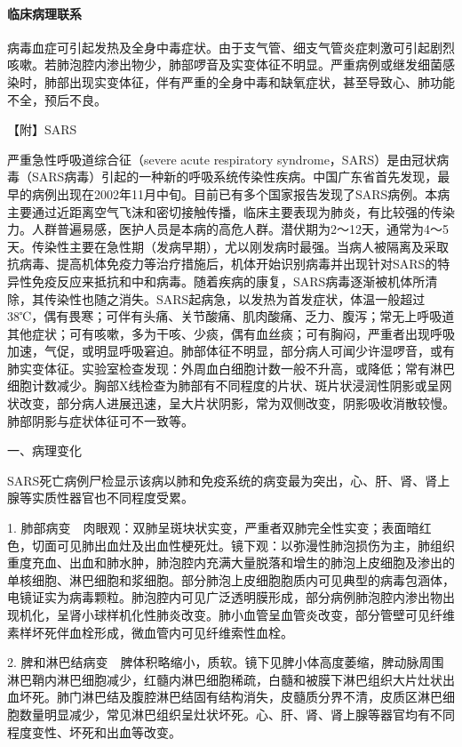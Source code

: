 \paragraph{临床病理联系}
病毒血症可引起发热及全身中毒症状。由于支气管、细支气管炎症刺激可引起剧烈咳嗽。若肺泡腔内渗出物少，肺部啰音及实变体征不明显。严重病例或继发细菌感染时，肺部出现实变体征，伴有严重的全身中毒和缺氧症状，甚至导致心、肺功能不全，预后不良。

{【附】SARS}

严重急性呼吸道综合征（severe acute respiratory
syndrome，SARS）是由冠状病毒（SARS病毒）引起的一种新的呼吸系统传染性疾病。中国广东省首先发现，最早的病例出现在2002年11月中旬。目前已有多个国家报告发现了SARS病例。本病主要通过近距离空气飞沫和密切接触传播，临床主要表现为肺炎，有比较强的传染力。人群普遍易感，医护人员是本病的高危人群。潜伏期为2～12天，通常为4～5天。传染性主要在急性期（发病早期），尤以刚发病时最强。当病人被隔离及采取抗病毒、提高机体免疫力等治疗措施后，机体开始识别病毒并出现针对SARS的特异性免疫反应来抵抗和中和病毒。随着疾病的康复，SARS病毒逐渐被机体所清除，其传染性也随之消失。SARS起病急，以发热为首发症状，体温一般超过38℃，偶有畏寒；可伴有头痛、关节酸痛、肌肉酸痛、乏力、腹泻；常无上呼吸道其他症状；可有咳嗽，多为干咳、少痰，偶有血丝痰；可有胸闷，严重者出现呼吸加速，气促，或明显呼吸窘迫。肺部体征不明显，部分病人可闻少许湿啰音，或有肺实变体征。实验室检查发现：外周血白细胞计数一般不升高，或降低；常有淋巴细胞计数减少。胸部X线检查为肺部有不同程度的片状、斑片状浸润性阴影或呈网状改变，部分病人进展迅速，呈大片状阴影，常为双侧改变，阴影吸收消散较慢。肺部阴影与症状体征可不一致等。

一、病理变化

SARS死亡病例尸检显示该病以肺和免疫系统的病变最为突出，心、肝、肾、肾上腺等实质性器官也不同程度受累。

1.
肺部病变　肉眼观：双肺呈斑块状实变，严重者双肺完全性实变；表面暗红色，切面可见肺出血灶及出血性梗死灶。镜下观：以弥漫性肺泡损伤为主，肺组织重度充血、出血和肺水肿，肺泡腔内充满大量脱落和增生的肺泡上皮细胞及渗出的单核细胞、淋巴细胞和浆细胞。部分肺泡上皮细胞胞质内可见典型的病毒包涵体，电镜证实为病毒颗粒。肺泡腔内可见广泛透明膜形成，部分病例肺泡腔内渗出物出现机化，呈肾小球样机化性肺炎改变。肺小血管呈血管炎改变，部分管壁可见纤维素样坏死伴血栓形成，微血管内可见纤维索性血栓。

2.
脾和淋巴结病变　脾体积略缩小，质软。镜下见脾小体高度萎缩，脾动脉周围淋巴鞘内淋巴细胞减少，红髓内淋巴细胞稀疏，白髓和被膜下淋巴组织大片灶状出血坏死。肺门淋巴结及腹腔淋巴结固有结构消失，皮髓质分界不清，皮质区淋巴细胞数量明显减少，常见淋巴组织呈灶状坏死。心、肝、肾、肾上腺等器官均有不同程度变性、坏死和出血等改变。

